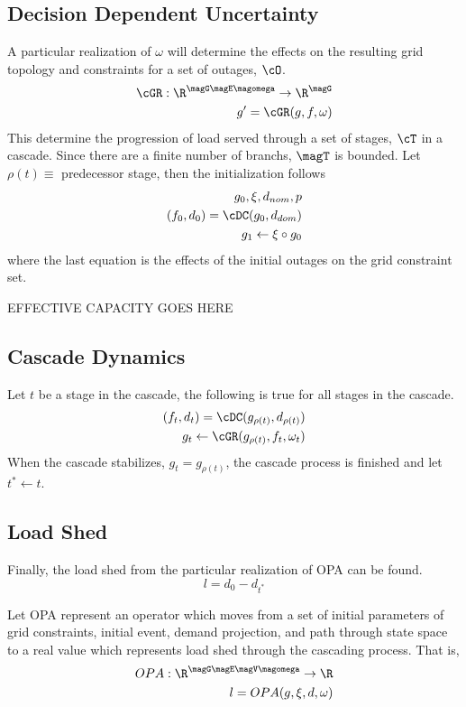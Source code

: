 \subsection{Decision Dependent Uncertainty}
A particular realization of $\omega$ will determine the effects on the resulting grid topology and constraints for a set of outages, $\cO$.
\begin{align}
\cGR : \R^{ \magG \magE \magomega  }   \rightarrow  \R^{ \magG }  \\
	g ' = \cGR ( g , f , \omega  )
\end{align}
This determine the progression of load served through a set of stages, $\cT$ in a cascade.  Since there are a finite number of branchs, $\magT$ is bounded.  Let $\rho( t ) \equiv $ predecessor stage, then the initialization follows
\begin{align}
	g_0, \xi, d_{nom}, p \\
	( f_0, d_0 ) = \cDC ( g_0, d_{dom} ) 	\\
	g_1 \leftarrow \xi \circ g_0
\end{align}
where the last equation is the effects of the initial outages on the grid constraint set.

EFFECTIVE CAPACITY GOES HERE

\subsection{Cascade Dynamics}
Let $t$ be a stage in the cascade, the following is true for all stages in the cascade. 
\begin{align}
	( f_t , d_t ) = \cDC ( g_{ \rho (t) } , d_{ \rho (t) } )		\\
	g_t \leftarrow \cGR ( g_{ \rho (t) } , f_t , \omega_t )	
\end{align}
When the cascade stabilizes, $ g_t = g_{ \rho (t) } $, the cascade process is finished and let $t^* \leftarrow t$.\\


\subsection{Load Shed}
Finally, the load shed from the particular realization of OPA can be found.
\begin{equation}
	l = d_0  -  d_{ t^* }
\end{equation}



Let OPA represent an operator which moves from a set of initial parameters of grid constraints, initial event, demand projection, and path through state space to a real value which represents load shed through the cascading process.  That is,
\begin{align}
OPA : \R^{ \magG  \magE  \magV  \magomega }  \rightarrow  \R \\
l = OPA ( g, \xi, d, \omega )
\end{align}

